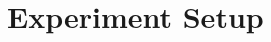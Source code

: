 \documentclass[11pt]{article}
\begin{document}





\FloatBarrier

%

\clearpage
\appendix


\section{Experiment Setup}
\label{app:experimental_setup}

\end{document}
